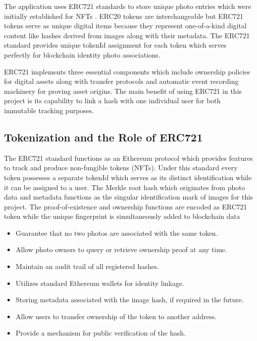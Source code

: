The application uses ERC721 standards to store unique photo entries which were initially established for NFTs  \cite{erc721}. ERC20 tokens are interchangeable but ERC721 tokens serve as unique digital items because they represent one-of-a-kind digital content like hashes derived from images along with their metadata. The ERC721 standard provides unique tokenId assignment for each token which serves perfectly for blockchain identity photo associations.

ERC721 implements three essential components which include ownership policies for digital assets along with transfer protocols and automatic event recording machinery for proving asset origins. The main benefit of using ERC721 in this project is its capability to link a hash with one individual user for both immutable tracking purposes.

\subsection{Tokenization and the Role of ERC721}
The ERC721 standard functions as an Ethereum protocol which provides features to track and produce non-fungible tokens (NFTs). Under this standard every token possesses a separate tokenId which serves as its distinct identification while it can be assigned to a user. The Merkle root hash which originates from photo data and metadata functions as the singular identification mark of images for this project. The proof-of-existence and ownership functions are encoded as ERC721 token while the unique fingerprint is simultaneously added to blockchain data

\begin{itemize}
    \item Guarantee that no two photos are associated with the same token.
    \item Allow photo owners to query or retrieve ownership proof at any time.
    \item Maintain an audit trail of all registered hashes.
    \item Utilizes standard Ethereum wallets for identity linkage.
    \item Storing metadata associated with the image hash, if required in the future.
    \item Allow users to transfer ownership of the token to another address.
    \item Provide a mechanism for public verification of the hash.
\end{itemize}

